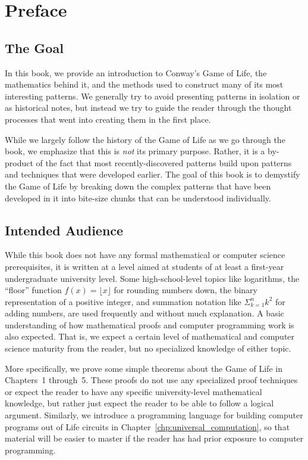 \renewcommand{\chapterfolder}{preface/}
\chapter{Preface}


\section*{The Goal}

In this book, we provide an introduction to Conway's Game of Life, the mathematics behind it, and the methods used to construct many of its most interesting patterns. We generally try to avoid presenting patterns in isolation or as historical notes, but instead we try to guide the reader through the thought processes that went into creating them in the first place.

While we largely follow the history of the Game of Life as we go through the book, we emphasize that this is \emph{not} its primary purpose. Rather, it is a by-product of the fact that most recently-discovered patterns build upon patterns and techniques that were developed earlier. The goal of this book is to demystify the Game of Life by breaking down the complex patterns that have been developed in it into bite-size chunks that can be understood individually.


\section*{Intended Audience}

While this book does not have any formal mathematical or computer science prerequisites, it is written at a level aimed at students of at least a first-year undergraduate university level. Some high-school-level topics like logarithms, the ``floor'' function $f(x) = \lfloor x \rfloor$ for rounding numbers down, the binary representation of a positive integer, and summation notation like $\Sigma_{k=1}^n k^2$ for adding numbers, are used frequently and without much explanation. A basic understanding of how mathematical proofs and computer programming work is also expected. That is, we expect a certain level of mathematical and computer science maturity from the reader, but no specialized knowledge of either topic.

More specifically, we prove some simple theorems about the Game of Life in Chapters~1 through~5. These proofs do not use any specialized proof techniques or expect the reader to have any specific university-level mathematical knowledge, but rather just expect the reader to be able to follow a logical argument. Similarly, we introduce a programming language for building computer programs out of Life circuits in Chapter~\ref{chp:universal_computation}, so that material will be easier to master if the reader has had prior exposure to computer programming.

